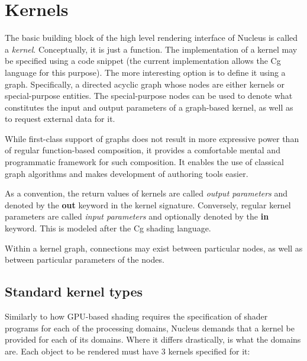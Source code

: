 \section{Kernels}

The basic building block of the high level rendering interface of Nucleus is called a \emph{kernel}. Conceptually, it is just a function. The implementation of a kernel may be specified using a code snippet (the current implementation allows the Cg language for this purpose). The more interesting option is to define it using a graph. Specifically, a directed acyclic graph whose nodes are either kernels or special-purpose entities. The special-purpose nodes can be used to denote what constitutes the input and output parameters of a graph-based kernel, as well as to request external data for it.

While first-class support of graphs does not result in more expressive power than of regular function-based composition, it provides a comfortable mental and programmatic framework for such composition. It enables the use of classical graph algorithms and makes development of authoring tools easier.

As a convention, the return values of kernels are called \emph{output parameters} and denoted by the \textbf{out} keyword in the kernel signature. Conversely, regular kernel parameters are called \emph{input parameters} and optionally denoted by the \textbf{in} keyword. This is modeled after the Cg shading language.

Within a kernel graph, connections may exist between particular nodes, as well as between particular parameters of the nodes.

\subsection{Standard kernel types}

Similarly to how GPU-based shading requires the specification of shader programs for each of the processing domains, Nucleus demands that a kernel be provided for each of its domains. Where it differs drastically, is what the domains are. Each object to be rendered must have 3 kernels specified for it:

